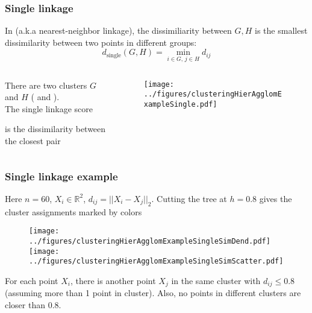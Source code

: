 \documentclass{beamer}
\begin{document}
\begin{frame}
\frametitle{Single linkage}
In  (a.k.a nearest-neighbor linkage), the dissimiliarity between $G,H$ is the smallest dissimilarity 
between two points in different groups:
\[
d_{\textrm{single}}(G,H) = \min_{i \in G, \, j \in H} d_{ij}
\]
\begin{columns}[T]
\begin{column}{.52\textwidth}
\vsp

 There are two clusters $G$ and $H$ ( and ).  \\ The single linkage
score 


is the dissimilarity between the closest pair 

\end{column}
\begin{column}{.48\textwidth}
\begin{figure}[h!]
  \centering
  \texttt{[image: ../figures/clusteringHierAgglomExampleSingle.pdf]}
\end{figure}
\end{column}
\end{columns}
\end{frame}

\begin{frame}
\frametitle{Single linkage example}
Here $n = 60$, $X_i \in \mathbb{R}^2$, $d_{ij} = || X_i - X_j||_2$.  Cutting the tree at $h = 0.8$ gives the cluster
assignments marked by colors
\begin{figure}[h!]
  \centering
  \texttt{[image: ../figures/clusteringHierAgglomExampleSingleSimDend.pdf]}
  \texttt{[image: ../figures/clusteringHierAgglomExampleSingleSimScatter.pdf]}  
\end{figure}
 For each point $X_i$, there is another point $X_j$ in the same cluster with $d_{ij} \leq 0.8$
(assuming more than 1 point in cluster).  Also, no points in different clusters are closer than 0.8.
\end{frame}
\end{document}

